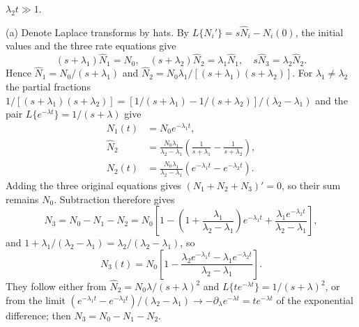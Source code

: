 \quad$\lambda_{2}t\gg1$.
\par{}
\solution
(a) Denote Laplace transforms by hats. By
$L\{N_i'\}=s\widehat N_i-N_i(0)$, the initial values
and the three rate equations give
\[
(s+\lambda_1)\widehat N_1=N_0,\quad
(s+\lambda_2)\widehat N_2=\lambda_1\widehat N_1,\quad
s\widehat N_3=\lambda_2\widehat N_2.
\]
Hence $\widehat N_1=N_0/(s+\lambda_1)$ and
$\widehat N_2=N_0\lambda_1/[(s+\lambda_1)(s+\lambda_2)]$.
For $\lambda_1\ne\lambda_2$ the partial fractions
$1/[(s+\lambda_1)(s+\lambda_2)]
=[1/(s+\lambda_1)-1/(s+\lambda_2)]/(\lambda_2-\lambda_1)$
and the pair $L\{e^{-\lambda t}\}=1/(s+\lambda)$ give
\begin{align*}
N_1(t)&=N_0e^{-\lambda_1t},\\
\widehat N_2&=\frac{N_0\lambda_1}{\lambda_2-\lambda_1}
\left(\frac1{s+\lambda_1}-\frac1{s+\lambda_2}\right),\\
N_2(t)&=\frac{N_0\lambda_1}{\lambda_2-\lambda_1}
(e^{-\lambda_1t}-e^{-\lambda_2t}).
\end{align*}
Adding the three original equations gives
$(N_1+N_2+N_3)'=0$, so their sum remains $N_0$. Subtraction
therefore gives
\[
N_3=N_0-N_1-N_2=N_0\left[1-\left(1+\frac{\lambda_1}
{\lambda_2-\lambda_1}\right)e^{-\lambda_1t}
+\frac{\lambda_1e^{-\lambda_2t}}{\lambda_2-\lambda_1}\right],
\]
and $1+\lambda_1/(\lambda_2-\lambda_1)=\lambda_2/(\lambda_2-\lambda_1)$,
so
\[
\boxed{N_3(t)=N_0\left[1-
\frac{\lambda_2e^{-\lambda_1t}-\lambda_1e^{-\lambda_2t}}
{\lambda_2-\lambda_1}\right]}.
\]
They follow either from $\widehat N_2=N_0\lambda/(s+\lambda)^2$
and $L\{te^{-\lambda t}\}=1/(s+\lambda)^2$, or from the limit
$(e^{-\lambda_1t}-e^{-\lambda_2t})/(\lambda_2-\lambda_1)\to
-\partial_\lambda e^{-\lambda t}=te^{-\lambda t}$ of the
exponential difference; then $N_3=N_0-N_1-N_2$.

